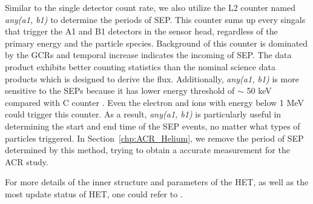 Similar to the single detector count rate, we also utilize the L2 counter named \textit{any(a1, b1)} to determine the periods of \ac{SEP}. This counter sums up every singals that trigger the A1 and B1 detectors in the sensor head, regardless of the primary energy and the particle species. Background of this counter is dominated by the \acp{GCR} and temporal increase indicates the incoming of \ac{SEP}. The data product exhibits better counting statistics than the nominal science data products which is designed to derive the flux. Additionally, \textit{any(a1, b1)} is more sensitive to the \acp{SEP} because it has lower energy threshold of $\sim$ 50 keV compared with C counter \citep{Elftmann-2020-PhD}. Even the electron and ions with energy below 1 MeV could trigger this counter. As a result, \textit{any(a1, b1)} is particularly useful in determining the start and end time of the \ac{SEP} events, no matter what types of particles triggered. In Section~\ref{chp:ACR_Helium}, we remove the period of \ac{SEP} determined by this method, trying to obtain a accurate measurement for the \ac{ACR} study.

For more details of the inner structure and parameters of the HET, as well as the most update status of HET, one could refer to \citet{RodriguezPacheco-2019-EPD, Wimmer2021AA,Elftmann-2020-PhD}.

